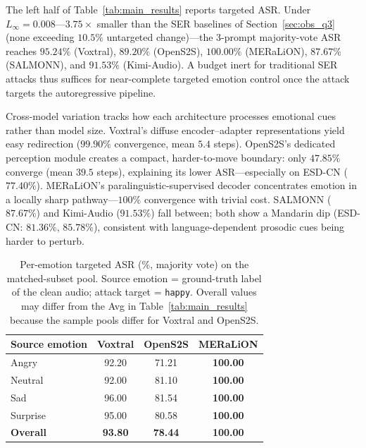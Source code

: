 The left half of Table~\ref{tab:main_results} reports targeted ASR.
Under $L_\infty{=}0.008$---$3.75{\times}$ smaller than the SER baselines of Section~\ref{sec:obs_q3} (none exceeding $10.5\%$ untargeted change)---the 3-prompt majority-vote ASR reaches $95.24\%$ (Voxtral), $89.20\%$ (OpenS2S), $100.00\%$ (MERaLiON), $87.67\%$ (SALMONN), and $91.53\%$ (Kimi-Audio).
A budget inert for traditional SER attacks thus suffices for near-complete targeted emotion control once the attack targets the autoregressive pipeline.

Cross-model variation tracks how each architecture processes emotional cues rather than model size.
Voxtral's diffuse encoder--adapter representations yield easy redirection ($99.90\%$ convergence, mean $5.4$ steps).
OpenS2S's dedicated perception module creates a compact, harder-to-move boundary: only $47.85\%$ converge (mean $39.5$ steps), explaining its lower ASR---especially on ESD-CN ($77.40\%$).
MERaLiON's paralinguistic-supervised decoder concentrates emotion in a locally sharp pathway---$100\%$ convergence with trivial cost.
SALMONN ($87.67\%$) and Kimi-Audio ($91.53\%$) fall between; both show a Mandarin dip (ESD-CN: $81.36\%$, $85.78\%$), consistent with language-dependent prosodic cues being harder to perturb.


\begin{table}[!t]
\centering
\small
\caption{Per-emotion targeted ASR (\%, majority vote) on the matched-subset pool.
Source emotion = ground-truth label of the clean audio; attack target = \texttt{happy}.
Overall values may differ from the Avg in Table~\ref{tab:main_results} because the sample pools differ for Voxtral and OpenS2S.}
\label{tab:per_emotion_asr}
\setlength{\tabcolsep}{10pt}
\begin{tabular}{l c c c}
\toprule
\textbf{Source emotion} & \textbf{Voxtral} & \textbf{OpenS2S} & \textbf{MERaLiON} \\
\midrule
Angry    & 92.20 & 71.21 & \textbf{100.00} \\
Neutral  & 92.00 & 81.10 & \textbf{100.00} \\
Sad      & 96.00 & 81.54 & \textbf{100.00} \\
Surprise & 95.00 & 80.58 & \textbf{100.00} \\
\midrule
\textbf{Overall} & \textbf{93.80} & \textbf{78.44} & \textbf{100.00} \\
\bottomrule
\end{tabular}
\end{table}

